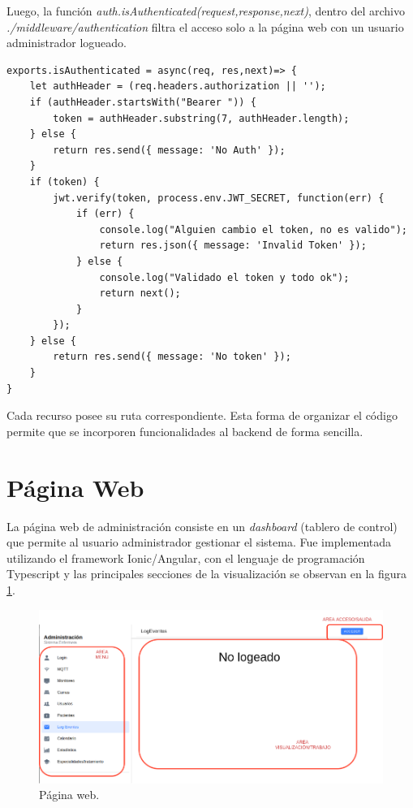 Luego, la función \textit{auth.isAuthenticated(request,response,next)}, dentro del archivo \textit{./middleware/authentication} filtra el acceso solo a la página web con un usuario administrador logueado.
\begin{lstlisting}[label=cod: Autorización,caption=  Control de token]
exports.isAuthenticated = async(req, res,next)=> {
    let authHeader = (req.headers.authorization || '');
    if (authHeader.startsWith("Bearer ")) {
        token = authHeader.substring(7, authHeader.length);
    } else {
        return res.send({ message: 'No Auth' });
    }
    if (token) {
        jwt.verify(token, process.env.JWT_SECRET, function(err) {
            if (err) {
                console.log("Alguien cambio el token, no es valido");
                return res.json({ message: 'Invalid Token' });
            } else {
                console.log("Validado el token y todo ok");
                return next();
            }
        });
    } else {
        return res.send({ message: 'No token' });
    }
}
\end{lstlisting}

Cada recurso posee su ruta correspondiente. Esta forma de organizar el código permite que se incorporen funcionalidades al backend de forma sencilla.

\pagebreak

\section{Página Web}

La página web de administración consiste en un \textit{dashboard} (tablero de control) que permite al usuario administrador gestionar el sistema.
Fue implementada utilizando el framework Ionic/Angular, con el lenguaje de programación Typescript y las principales secciones de la visualización se observan en la figura \ref{fig:Página web}.

\begin{figure}[ht]
	\centering
	\includegraphics[scale=.48]{./Figures/pagina-web.png}
	\caption{Página web.}
	\label{fig:Página web}
\end{figure}

